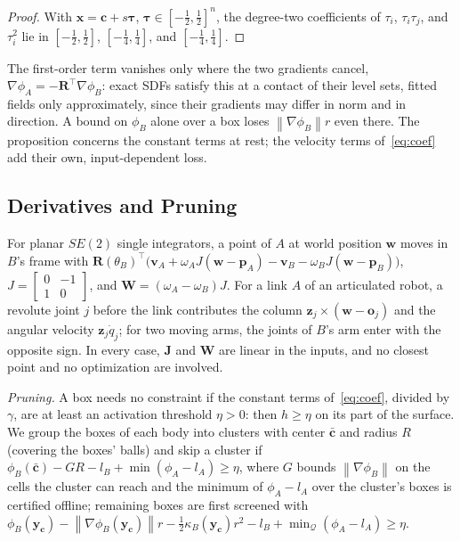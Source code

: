 \documentclass[journal]{IEEEtran}
\theoremstyle{definition}
\newcommand{\norm}[1]{\left\lVert #1\right\rVert}
\newcommand{\Rot}{\mathbf{R}}
\begin{document}
\begin{proof}
With $\mathbf x=\mathbf c+s\boldsymbol\tau$, $\boldsymbol\tau\in[-\frac12,\frac12]^n$, the degree-two
coefficients of $\tau_i$, $\tau_i\tau_j$, and $\tau_i^2$ lie in $[-\frac12,\frac12]$,
$[-\frac14,\frac14]$, and $[-\frac14,\frac14]$.
\end{proof}
The first-order term vanishes only where the two gradients cancel, $\nabla\phi_A=-\Rot^\top\nabla\phi_B$:
exact SDFs satisfy this at a contact of their level sets, fitted fields only approximately, since
their gradients may differ in norm and in direction. A bound on $\phi_B$ alone over a box loses
$\norm{\nabla\phi_B}r$ even there. The proposition concerns the constant terms at rest; the velocity
terms of~\eqref{eq:coef} add their own, input-dependent loss.

\subsection{Derivatives and Pruning}\label{sec:cover-der}
For planar $SE(2)$ single integrators, a point of $A$ at world position $\mathbf w$ moves in $B$'s frame
with $\Rot(\theta_B)^{\!\top}\big(\mathbf v_A+\omega_AJ(\mathbf w-\mathbf p_A)-\mathbf v_B-\omega_BJ(\mathbf w-\mathbf p_B)\big)$,
$J=\left[\begin{smallmatrix}0&-1\\1&0\end{smallmatrix}\right]$, and
$\mathbf W=(\omega_A-\omega_B)J$. For a link $A$ of an articulated robot, a revolute joint $j$ before
the link contributes the column $\mathbf z_j\times(\mathbf w-\mathbf o_j)$ and the angular velocity
$\mathbf z_j\dot q_j$; for two moving arms, the joints of $B$'s arm enter with the opposite sign. In
every case, $\mathbf J$ and $\mathbf W$ are linear in the inputs, and no closest point and no
optimization are involved.

\emph{Pruning.} A box needs no constraint if the constant terms of~\eqref{eq:coef}, divided by
$\gamma$, are at least an activation threshold $\eta>0$: then $h\ge\eta$ on its part of the surface.
We group the boxes of each body into clusters with center $\bar{\mathbf c}$ and radius $R$ (covering
the boxes' balls) and skip a cluster if $\phi_B(\bar{\mathbf c})-GR-l_B+\min(\phi_A-l_A)\ge\eta$,
where $G$ bounds $\norm{\nabla\phi_B}$ on the cells the cluster can reach and the minimum of
$\phi_A-l_A$ over the cluster's boxes is certified offline; remaining boxes are first screened with
$\phi_B(\mathbf y_{\mathbf c})-\norm{\nabla\phi_B(\mathbf y_{\mathbf c})}r-\frac12\kappa_B(\mathbf y_{\mathbf c})r^2-l_B+\min_{\mathcal Q}(\phi_A-l_A)\ge\eta$.
\end{document}
